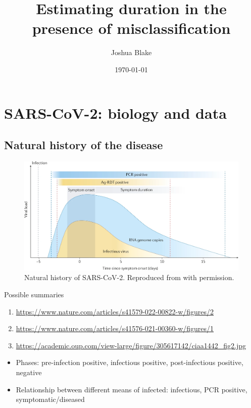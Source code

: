 \documentclass[thesis.tex]{subfiles}
\title{Estimating duration in the presence of misclassification}
\author{Joshua Blake}
\date{\today}
\begin{document}
\ifSubfilesClassLoaded{
  \setcounter{chapter}{1}
}

\chapter{SARS-CoV-2: biology and data} \label{intro:sec:studies}

\section{Natural history of the disease} \label{biology-data:sec:natural-history}

\begin{figure}
  \centering\includegraphics[width=\textwidth]{biology-data/natural-history}
  \caption[Natural history of SARS-CoV-2.]{Natural history of SARS-CoV-2. Reproduced from \textcite{puhachSARSCoV2} with permission.}
  \label{biology-data:fig:natural-history}
\end{figure}

Possible summaries
\begin{enumerate}
  \item \url{https://www.nature.com/articles/s41579-022-00822-w/figures/2}
  \item \url{https://www.nature.com/articles/s41576-021-00360-w/figures/1}
  \item \url{https://academic.oup.com/view-large/figure/305617142/ciaa1442_fig2.jpg}
\end{enumerate}

\begin{itemize}
  \item Phases: pre-infection positive, infectious positive, post-infectious positive, negative
  \item Relationship between different means of infected: infectious, PCR positive, symptomatic/diseased
\end{itemize}
\end{document}
